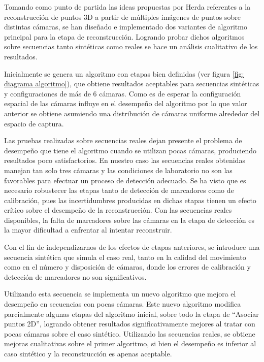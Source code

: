 Tomando como punto de partida las ideas propuestas por Herda referentes a la reconstrucción de puntos 3D a partir de múltiples imágenes de puntos sobre distintas cámaras,  se han diseñado e implementado dos variantes de algoritmo principal para la etapa de reconstrucción. Logrando probar dichos algoritmos sobre secuencias tanto sintéticas como reales se hace un análisis cualitativo de los resultados.


Inicialmente se genera un algoritmo con etapas bien definidas (ver figura \ref{fig: diagrama algoritmo}), que obtiene resultados aceptables para secuencias sintéticas y configuraciones de más de 6 cámaras. Como es de esperar la configuración espacial de las cámaras influye en el desempeño del algoritmo por lo que valor anterior se obtiene asumiendo una distribución de cámaras uniforme alrededor del espacio de captura.


Las pruebas realizadas sobre secuencias reales dejan presente el problema de desempeño que tiene el algoritmo cuando se utilizan pocas cámaras, produciendo resultados poco satisfactorios. 
En nuestro caso las secuencias reales obtenidas manejan tan solo tres cámaras y las condiciones de laboratorio no son las favorables para efectuar un proceso de detección adecuado. Se ha visto que es necesario robustecer las etapas tanto de detección de marcadores  como de calibración, pues las incertidumbres producidas en dichas etapas tienen un efecto crítico sobre el desempeño de la reconstrucción. Con las secuencias reales disponibles, la falta de marcadores sobre las cámaras en la etapa de detección es la mayor dificultad a enfrentar al intentar reconstruir. 



Con el fin de independizarnos de los efectos de etapas anteriores, se introduce una secuencia sintética que simula el caso real, tanto en la calidad del movimiento como en el número y disposición de cámaras, donde los errores de calibración y detección de marcadores no son significativos.


Utilizando esta secuencia se implementa un nuevo algoritmo que mejora el desempeño en secuencias con pocas cámaras. Este nuevo algoritmo modifica parcialmente algunas etapas del algoritmo inicial, sobre todo la etapa de “Asociar puntos 2D”, logrando obtener resultados significativamente mejores al tratar con pocas cámaras sobre el caso sintético.
Utilizando las secuencias reales, se obtiene mejoras cualitativas sobre el primer algoritmo, si bien el desempeño es inferior al caso sintético y la reconstrucción es apenas aceptable.  \\ 


